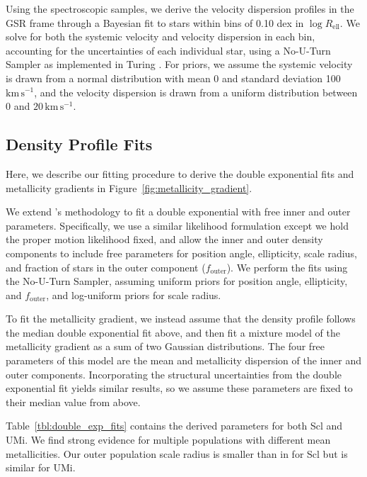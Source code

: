 \documentclass[times,trackchanges, twocolumn, twocolappendix]{aastex701}
\newcommand{\kms}{\mathrm{km\,s^{-1}}}
\newcommand{\jj}{\citetalias{jensen+2024}}
\begin{document}
Using the spectroscopic samples, we derive the velocity dispersion profiles in the GSR frame through a Bayesian fit to stars within bins of 0.10 dex in $\log R_\textrm{ell}$. We solve for both the systemic velocity and velocity dispersion in each bin, accounting for the uncertainties of each individual star, using a No-U-Turn Sampler \citep[NUTS, an adaptive Hamiltonian Monte Carlo method][]{NUTS} as implemented in Turing \citep{turing}. For priors, we assume the systemic velocity is drawn from a normal distribution with mean 0 and standard deviation 100\,$\kms$, and the velocity dispersion is drawn from a uniform distribution between 0 and $20\,\kms$. 


\subsection{Density Profile Fits} 

Here, we describe our fitting procedure to derive the double exponential fits and metallicity gradients in Figure~\ref{fig:metallicity_gradient}.

We extend \jj{}'s methodology to fit a double exponential with free inner and outer parameters. Specifically, we use a similar likelihood formulation except we hold the proper motion likelihood fixed, and allow the inner and outer density components to include free parameters for position angle, ellipticity, scale radius, and fraction of stars in the outer component ($f_\text{outer}$). We perform the fits using the No-U-Turn Sampler, assuming uniform priors for position angle, ellipticity, and $f_\text{outer}$, and log-uniform priors for scale radius.

To fit the metallicity gradient, we instead assume that the density profile follows the median double exponential fit above, and then fit a mixture model of the metallicity gradient as a sum of two Gaussian distributions. The four free parameters of this model are the mean and metallicity dispersion of the inner and outer components. Incorporating the structural uncertainties from the double exponential fit yields similar results, so we assume these parameters are fixed to their median value from above.

Table~\ref{tbl:double_exp_fits} contains the derived parameters for both Scl and UMi. We find strong evidence for multiple populations with different mean metallicities. Our outer population scale radius is smaller than in \jj{} for Scl but is similar for UMi. 
\end{document}
